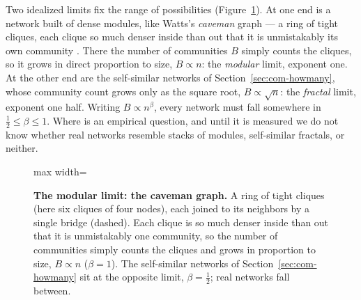 Two idealized limits fix the range of possibilities
(Figure~\ref{fig:com-caveman}). At one end is a network built of dense modules,
like Watts's \emph{caveman} graph --- a ring of tight cliques, each clique so much
denser inside than out that it is unmistakably its own community
\citep{watts1999caveman}. There the number of communities $B$ simply counts the
cliques, so it grows in direct proportion to size, $B\propto n$: the \emph{modular}
limit, exponent one. At the other end are the self-similar networks of
Section~\ref{sec:com-howmany}, whose community count grows only as the square root,
$B\propto\sqrt{n}$: the \emph{fractal} limit, exponent one half. Writing
$B\propto n^{\beta}$, every network must fall somewhere in $\tfrac12\le\beta\le1$.
Where is an empirical question, and until it is measured we do not know whether
real networks resemble stacks of modules, self-similar fractals, or neither.

\begin{figure}[t]
\centering
\begin{adjustbox}{max width=\linewidth}\end{adjustbox}
\caption{\textbf{The modular limit: the caveman graph.} A ring of tight cliques
(here six cliques of four nodes), each joined to its neighbors by a single bridge
(dashed). Each clique is so much denser inside than out that it is unmistakably one
community, so the number of communities simply counts the cliques and grows in
proportion to size, $B\propto n$ ($\beta=1$). The self-similar networks of
Section~\ref{sec:com-howmany} sit at the opposite limit, $\beta=\tfrac12$; real
networks fall between.}
\label{fig:com-caveman}
\end{figure}

